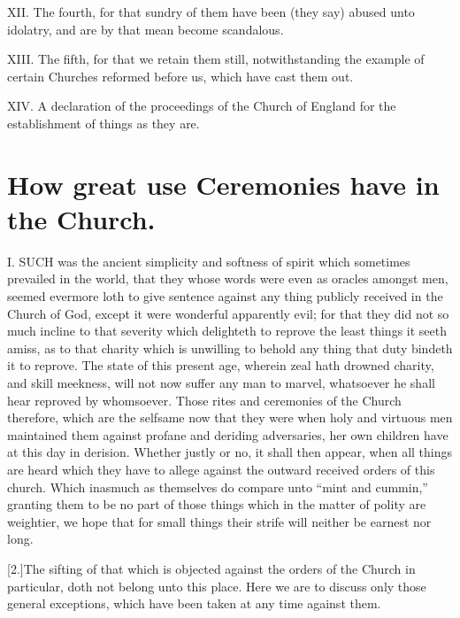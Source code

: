 XII. The fourth, for that sundry of them have been (they say) abused unto idolatry, and are by that mean become scandalous. 

XIII. The fifth, for that we retain them still, notwithstanding the example of certain Churches reformed before us, which have cast them out.

XIV. A declaration of the proceedings of the Church of England for the establishment of things as they are.

\PRLsep

\section*{How great use Ceremonies have in the Church.}

I. SUCH was the ancient simplicity and softness of spirit which sometimes prevailed in the world, that they whose words were even as oracles amongst men, seemed evermore loth to give sentence against any thing publicly received in the Church of God, except it were wonderful apparently evil; for that they did not so much incline to that severity which delighteth to reprove the least things it seeth amiss, as to that charity which is unwilling to behold any thing that duty bindeth it to reprove. The state of this present age, wherein zeal hath drowned charity, and skill meekness, will not now suffer any man to marvel, whatsoever he shall hear reproved by whomsoever. Those rites and ceremonies of the Church therefore, which are the selfsame now that they were when holy and virtuous men maintained them against profane and deriding adversaries, her own children have at this day in derision. Whether justly or no, it shall then appear, when all things are heard which they have to allege against the outward received orders of this church. Which inasmuch as themselves do compare unto “mint and cummin,” granting them to be no part of those things which in the matter of polity are weightier, we hope that for small things their strife will neither be earnest nor long.

[2.]The sifting of that which is objected against the orders of the Church in particular, doth not belong unto this place. Here we are to discuss only those general exceptions, which have been taken at any time against them.

